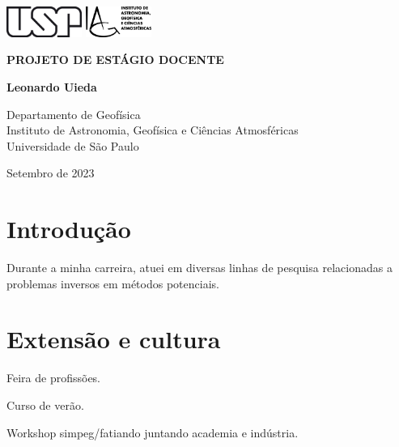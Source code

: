 \documentclass[11pt,a4paper,oneside]{book}
\newcommand{\Title}{Projeto de estágio docente}
\newcommand{\Year}{2023}
\newcommand{\Date}{Setembro de \Year{}}
\newcommand{\Author}{Leonardo Uieda}
\begin{document}
\pagestyle{empty}
\frontmatter

\begin{titlepage}
  \begin{center}
    \includegraphics[height=1cm]{figures/usp.png}
    \hfill
    \includegraphics[height=1cm]{figures/iag.png}
    \vspace{9cm}

    \textbf{\Huge \MakeUppercase{\Title{}}}
    \vspace{2cm}

    \textbf{\LARGE \Author{}}
    \vfill

    Departamento de Geofísica
    \\
    Instituto de Astronomia, Geofísica e Ciências Atmosféricas
    \\
    Universidade de São Paulo
    \vspace{2cm}

    \Date{}
  \end{center}
\end{titlepage}

\tableofcontents

\mainmatter
\pagestyle{fancy}

\chapter{Introdução}

Durante a minha carreira, atuei em diversas linhas de pesquisa relacionadas a
problemas inversos em métodos potenciais.

\chapter{Extensão e cultura}

Feira de profissões.

Curso de verão.

Workshop simpeg/fatiando juntando academia e indústria.

\end{document}
